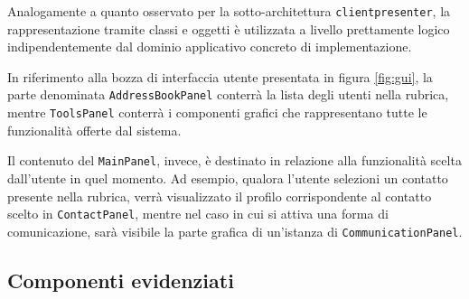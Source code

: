 Analogamente a quanto osservato per la sotto-architettura \texttt{clientpresenter}, la rappresentazione tramite classi e oggetti è utilizzata a livello prettamente logico indipendentemente dal dominio applicativo concreto di implementazione.

In riferimento alla bozza di interfaccia utente presentata in figura \vref{fig:gui}, la parte denominata \texttt{AddressBookPanel} conterrà la lista degli utenti nella rubrica, mentre \texttt{ToolsPanel} conterrà i componenti grafici che rappresentano tutte le funzionalità offerte dal sistema. 

Il contenuto del \texttt{MainPanel}, invece, è destinato in relazione alla funzionalità scelta dall'utente in quel momento. Ad esempio, qualora l'utente selezioni un contatto presente nella rubrica, verrà visualizzato il profilo corrispondente al contatto scelto in \texttt{ContactPanel}, mentre nel caso in cui si attiva una forma di comunicazione, sarà visibile la parte grafica di un'istanza di \texttt{CommunicationPanel}.

\subsection{Componenti evidenziati}

